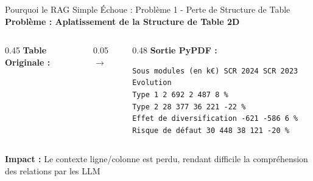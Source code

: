 \documentclass[11pt, aspectratio=169, xcolor=table]{beamer}
\begin{document}
\begin{frame}[fragile]{Pourquoi le RAG Simple Échoue : Problème 1 - Perte de Structure de Table}
    \centering
    \textbf{\color{MainNavy}Problème : Aplatissement de la Structure de Table 2D}
    \vspace{0.3cm}
    
    \begin{columns}[c]
        \begin{column}{0.45\textwidth}
            \centering
            \small\textbf{Table Originale :}
        \end{column}
        
        \begin{column}{0.05\textwidth}
            \centering $\rightarrow$
        \end{column}
        
        \begin{column}{0.48\textwidth}
            \small\textbf{Sortie PyPDF :}
            \begin{minipage}[t]{0.95\textwidth}
        \tiny
        \begin{verbatim}
Sous modules (en k€) SCR 2024 SCR 2023 Evolution 
Type 1 2 692 2 487 8 % 
Type 2 28 377 36 221 -22 % 
Effet de diversification -621 -586 6 % 
Risque de défaut 30 448 38 121 -20 %
        \end{verbatim}
    \end{minipage}
        \end{column}
    \end{columns}
    
    \vspace{0.3cm}
    \small\textbf{Impact :} Le contexte ligne/colonne est perdu, rendant difficile la compréhension des relations par les LLM
\end{frame}
\end{document}
